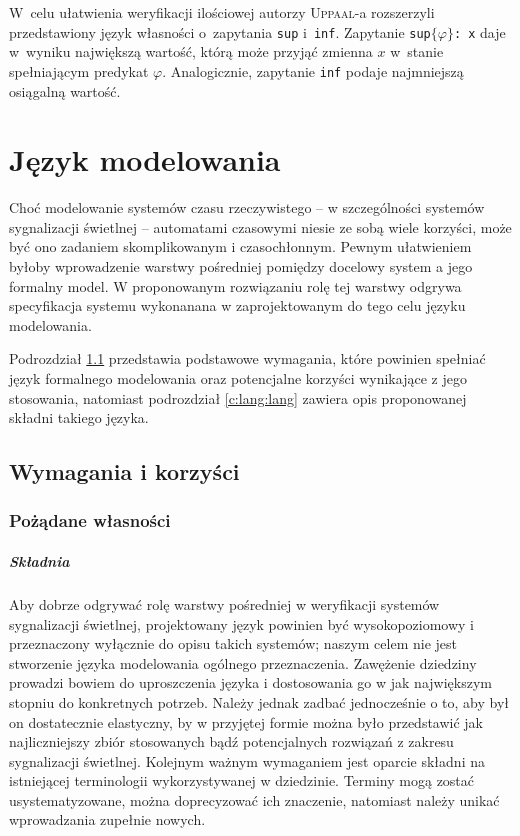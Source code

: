 \documentclass{pracamgr}
\newcommand{\upp}{\textsc{Uppaal}}
\theoremstyle{plain}
\begin{document}
W~celu ułatwienia weryfikacji ilościowej autorzy \upp-a rozszerzyli
przedstawiony język własności o~zapytania \texttt{sup} i~\texttt{inf}.
Zapytanie \texttt{sup$\{\varphi\}$: x} daje w~wyniku największą wartość,
którą może przyjąć zmienna $x$ w~stanie spełniającym predykat $\varphi$.
Analogicznie, zapytanie \texttt{inf} podaje najmniejszą osiągalną wartość.

\chapter{Język modelowania}

Choć modelowanie systemów czasu rzeczywistego -- w szczególności
systemów sygnalizacji świetlnej -- automatami czasowymi niesie ze sobą
wiele korzyści, może być ono zadaniem skomplikowanym i
czasochłonnym. Pewnym ułatwieniem byłoby wprowadzenie warstwy
pośredniej pomiędzy docelowy system a jego formalny model.  W
proponowanym rozwiązaniu rolę tej warstwy odgrywa specyfikacja systemu
wykonanana w zaprojektowanym do tego celu języku modelowania.

Podrozdział \ref{c:lang:req} przedstawia podstawowe wymagania, które
powinien spełniać język formalnego modelowania oraz potencjalne
korzyści wynikające z jego stosowania, natomiast podrozdział
\ref{c:lang:lang} zawiera opis proponowanej składni takiego języka.

\section{Wymagania i korzyści}
\label{c:lang:req}

\subsection{Pożądane własności}

\paragraph{Składnia} Aby dobrze odgrywać rolę warstwy pośredniej w
weryfikacji systemów sygnalizacji świetlnej, projektowany język
powinien być wysokopoziomowy i przeznaczony wyłącznie do opisu takich
systemów; naszym celem nie jest stworzenie języka modelowania ogólnego
przeznaczenia. Zawężenie dziedziny prowadzi bowiem do uproszczenia
języka i dostosowania go w jak największym stopniu do konkretnych
potrzeb. Należy jednak zadbać jednocześnie o to, aby był on
dostatecznie elastyczny, by w przyjętej formie można było przedstawić
jak najliczniejszy zbiór stosowanych bądź potencjalnych rozwiązań z
zakresu sygnalizacji świetlnej. Kolejnym ważnym wymaganiem jest
oparcie składni na istniejącej terminologii wykorzystywanej w
dziedzinie. Terminy mogą zostać usystematyzowane, można doprecyzować
ich znaczenie, natomiast należy unikać wprowadzania zupełnie nowych.
\end{document}
